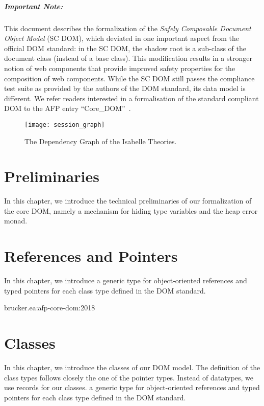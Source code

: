 \documentclass[10pt,DIV16,a4paper,abstract=true,twoside=semi,openright]
{scrreprt}
\begin{document}
\paragraph{Important Note:} This document describes the formalization
of the \emph{Safely Composable Document Object Model} (SC DOM), which
deviated in one important aspect from the official DOM standard: in
the SC DOM, the shadow root is a sub-class of the document class
(instead of a base class). This modification results in a stronger
notion of web components that provide improved safety properties for
the composition of web components. While the SC DOM still passes the
compliance test suite as provided by the authors of the DOM standard,
its data model is different. We refer readers interested in a
formalisation of the standard compliant DOM to the AFP entry
``Core\_DOM''~\cite{brucker.ea:afp-core-dom:2018}.


\begin{figure}
  \centering
  \texttt{[image: session\_graph]}
  \caption{The Dependency Graph of the Isabelle Theories.\label{fig:session-graph}}
\end{figure}

\clearpage

\chapter{Preliminaries}
\label{cha:perliminaries}
In this chapter, we introduce the technical preliminaries of our
formalization of the core DOM, namely a mechanism for hiding type
variables and the heap error monad.



\chapter{References and Pointers}
\label{cha:pointers}
In this chapter, we introduce a generic type for object-oriented
references and typed pointers for each class type defined in the DOM
standard. 



 brucker.ea:afp-core-dom:2018




\chapter{Classes}
\label{cha:classes}
In this chapter, we introduce the classes of our DOM model. 
The definition of the class types follows closely the one of the
pointer types.  Instead of datatypes, we use records for our classes.
a generic type for object-oriented references and typed pointers for
each class type defined in the DOM standard.






\end{document}
